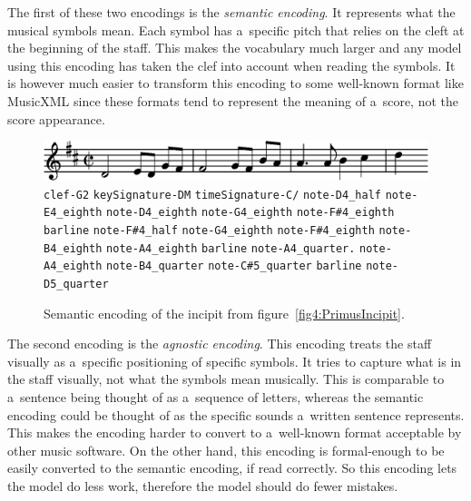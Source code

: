 The first of these two encodings is the \emph{semantic encoding}. It represents what the musical symbols mean. Each symbol has a~specific pitch that relies on the cleft at the beginning of the staff. This makes the vocabulary much larger and any model using this encoding has taken the clef into account when reading the symbols. It is however much easier to transform this encoding to some well-known format like MusicXML since these formats tend to represent the meaning of a~score, not the score appearance.

\begin{figure}[h]
    \centering
    \includegraphics[width=140mm]{../img/primus-incipit}
    \verb`clef-G2`
    \quad\verb`keySignature-DM`
    \quad\verb`timeSignature-C/`
    \quad\verb`note-D4_half`
    \quad\verb`note-E4_eighth`
    \quad\verb`note-D4_eighth`
    \quad\verb`note-G4_eighth`
    \quad\verb`note-F#4_eighth`
    \quad\verb`barline`
    \quad\verb`note-F#4_half`
    \quad\verb`note-G4_eighth`
    \quad\verb`note-F#4_eighth`
    \quad\verb`note-B4_eighth`
    \quad\verb`note-A4_eighth`
    \quad\verb`barline`
    \quad\verb`note-A4_quarter.`
    \quad\verb`note-A4_eighth`
    \quad\verb`note-B4_quarter`
    \quad\verb`note-C#5_quarter`
    \quad\verb`barline`
    \quad\verb`note-D5_quarter`
    \caption{Semantic encoding of the incipit from figure~\ref{fig4:PrimusIncipit}.}
    \label{fig4:PrimusIncipitSemanticEncoded}
\end{figure}

The second encoding is the \emph{agnostic encoding}. This encoding treats the staff visually as a~specific positioning of specific symbols. It tries to capture what is in the staff visually, not what the symbols mean musically. This is comparable to a~sentence being thought of as a~sequence of letters, whereas the semantic encoding could be thought of as the specific sounds a~written sentence represents. This makes the encoding harder to convert to a~well-known format acceptable by other music software. On the other hand, this encoding is formal-enough to be easily converted to the semantic encoding, if read correctly. So this encoding lets the model do less work, therefore the model should do fewer mistakes.

